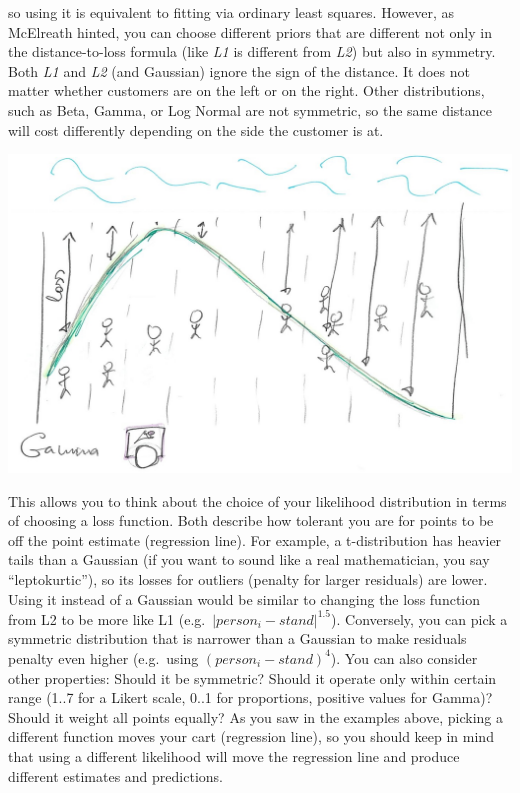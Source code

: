 \documentclass[
]{book}
\begin{document}
so using it is equivalent to fitting via ordinary least squares. However, as McElreath hinted, you can choose different priors that are different not only in the distance-to-loss formula (like \emph{L1} is different from \emph{L2}) but also in symmetry. Both \emph{L1} and \emph{L2} (and Gaussian) ignore the sign of the distance. It does not matter whether customers are on the left or on the right. Other distributions, such as Beta, Gamma, or Log Normal are not symmetric, so the same distance will cost differently depending on the side the customer is at.

\begin{center}\includegraphics[width=1\linewidth]{images/loss-functions-Gamma} \end{center}

This allows you to think about the choice of your likelihood distribution in terms of choosing a loss function. Both describe how tolerant you are for points to be off the point estimate (regression line). For example, a t-distribution has heavier tails than a Gaussian (if you want to sound like a real mathematician, you say ``leptokurtic''), so its losses for outliers (penalty for larger residuals) are lower. Using it instead of a Gaussian would be similar to changing the loss function from L2 to be more like L1 (e.g.~\(|person_i - stand|^{1.5}\)). Conversely, you can pick a symmetric distribution that is narrower than a Gaussian to make residuals penalty even higher (e.g.~using \((person_i - stand)^{4}\)). You can also consider other properties: Should it be symmetric? Should it operate only within certain range (1..7 for a Likert scale, 0..1 for proportions, positive values for Gamma)? Should it weight all points equally? As you saw in the examples above, picking a different function moves your cart (regression line), so you should keep in mind that using a different likelihood will move the regression line and produce different estimates and predictions.
\end{document}
